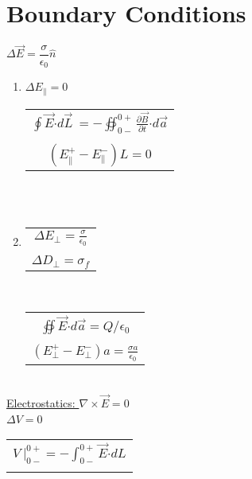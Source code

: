 \documentclass[12pt]{article}
\newcommand*{\dotP}{\boldsymbol \cdot}		%
\begin{document}
\section{Boundary Conditions}
\begin{minipage}[t]{.45\textwidth}
	\hfill \break
	\( \boxed{ \Delta \vec{E} = \dfrac{\sigma}{\epsilon_0} \hat{n} } \)
	\begin{enumerate}
		\item {
			\( \boxed{ \displaystyle \Delta E_{\parallel} = 0 } \)  \ \ \ 
			\begin{tabular}{|c}
				\( \displaystyle \oint \vec{E} \dotP d\vec{L} \ = 
					- \oiint_{0-}^{0+} \frac{\partial \vec{B}}{\partial t} \dotP d\vec{a} \) \\ \\
				\( \displaystyle (E_{\parallel}^{+} - E_{\parallel}^{-}) L = 0 \)
			\end{tabular}
		} \\ \\
		\item {
			\begin{tabular}{c}
				\( \boxed{ \displaystyle \Delta E_{\perp} = \frac{\sigma}{\epsilon_0} } \) \\ \\
				\( \boxed{ \displaystyle \Delta D_{\perp} = \sigma_f } \)
			\end{tabular}
			\ \ \
			\begin{tabular}{|c}
				\( \displaystyle \oiint \vec{E} \dotP d\vec{a} = Q/\epsilon_0 \) \\ \\
				\( \displaystyle ( E_{\perp}^{+} - E_{\perp}^{-} ) a = \frac{\sigma a}{\epsilon_0} \) 
			\end{tabular}
		}
	\end{enumerate}

	\hfill \break \\
	\underline{Electrostatics: \( \nabla \times \vec{E} = 0 \) } \\
	
	\( \boxed{ \Delta V = 0 } \) \ \ \ 
	\begin{tabular}{|c}
		\\
		\( \displaystyle V \ \bigg|_{0-}^{0+}= - \int_{0-}^{0+} \vec{E} \dotP dL \)\\
		\\
	\end{tabular}


\end{minipage}
\end{document}
